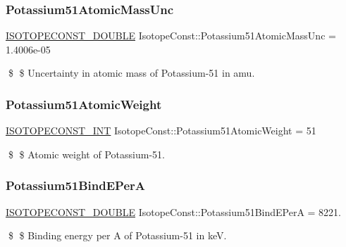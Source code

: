 \subsubsection{\texorpdfstring{Potassium51\+Atomic\+Mass\+Unc}{Potassium51AtomicMassUnc}}
{\footnotesize\ttfamily \mbox{\hyperlink{group___isotope_const-_macros_ga8f45a7272ce02c0b4c65c44636ed719a}{I\+S\+O\+T\+O\+P\+E\+C\+O\+N\+S\+T\+\_\+\+D\+O\+U\+B\+LE}} Isotope\+Const\+::\+Potassium51\+Atomic\+Mass\+Unc = 1.\+4006e-\/05}

\$ \$ Uncertainty in atomic mass of Potassium-\/51 in amu. \mbox{\label{group___isotope_const-_potassium-_k51_gabaa577e794fc9906a5abcdd1d1293f93}} 
\subsubsection{\texorpdfstring{Potassium51\+Atomic\+Weight}{Potassium51AtomicWeight}}
{\footnotesize\ttfamily \mbox{\hyperlink{group___isotope_const-_macros_ga5f18360b3e99483a35c32d789e62621c}{I\+S\+O\+T\+O\+P\+E\+C\+O\+N\+S\+T\+\_\+\+I\+NT}} Isotope\+Const\+::\+Potassium51\+Atomic\+Weight = 51}

\$ \$ Atomic weight of Potassium-\/51. \mbox{\label{group___isotope_const-_potassium-_k51_ga5a95ca9d91cced3d84e5223a4df70916}} 
\subsubsection{\texorpdfstring{Potassium51\+Bind\+E\+PerA}{Potassium51BindEPerA}}
{\footnotesize\ttfamily \mbox{\hyperlink{group___isotope_const-_macros_ga8f45a7272ce02c0b4c65c44636ed719a}{I\+S\+O\+T\+O\+P\+E\+C\+O\+N\+S\+T\+\_\+\+D\+O\+U\+B\+LE}} Isotope\+Const\+::\+Potassium51\+Bind\+E\+PerA = 8221.}

\$ \$ Binding energy per A of Potassium-\/51 in keV. \mbox{\label{group___isotope_const-_potassium-_k51_gab8973f9fa065cbe97675b1dfb3ab363a}} 
